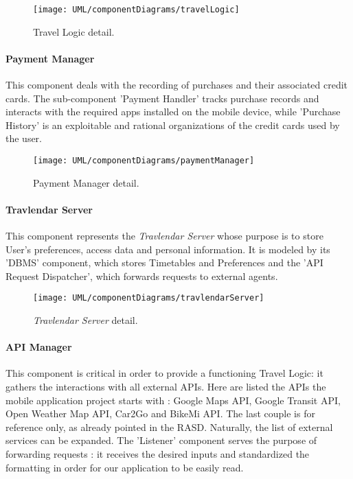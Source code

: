 		\begin{figure}[H]
			\centering
			\texttt{[image: UML/componentDiagrams/travelLogic]}
			\caption{Travel Logic detail.}
			\label{travelLogicDetail}
		\end{figure}
	

	\paragraph{Payment Manager}
		This component deals with the recording of purchases and their associated credit cards.
		The sub-component 'Payment Handler' tracks purchase records and interacts with the required apps installed on the mobile device, while 'Purchase History' is an exploitable and rational organizations of the credit cards used by the user.

		\begin{figure}[H]
			\centering
			\texttt{[image: UML/componentDiagrams/paymentManager]}
			\caption{Payment Manager detail.}
			\label{paymentManagerDetail}
		\end{figure}
		
		
	\paragraph{Travlendar Server} 
		This component represents the \textit{Travlendar Server} whose purpose is to store User's preferences, access data and personal information. It is modeled by its 'DBMS' component, which stores Timetables and Preferences and the 'API Request Dispatcher', which forwards requests to external agents.

		\begin{figure}[H]
			\centering
			\texttt{[image: UML/componentDiagrams/travlendarServer]}
			\caption{\textit{Travlendar Server} detail.}
			\label{serverDetail}
		\end{figure}


	\paragraph{API Manager} 
		This component is critical in order to provide a functioning Travel Logic: it gathers the interactions with all external APIs.
		Here are listed the APIs the mobile application project starts with : Google Maps API, Google Transit API, Open Weather Map API, Car2Go and BikeMi API.
		The last couple is for reference only, as already pointed in the RASD. Naturally, the list of external services can be expanded.
		The 'Listener' component serves the purpose of forwarding requests : it receives the desired inputs and standardized the formatting in order for our application to be easily read.
	
